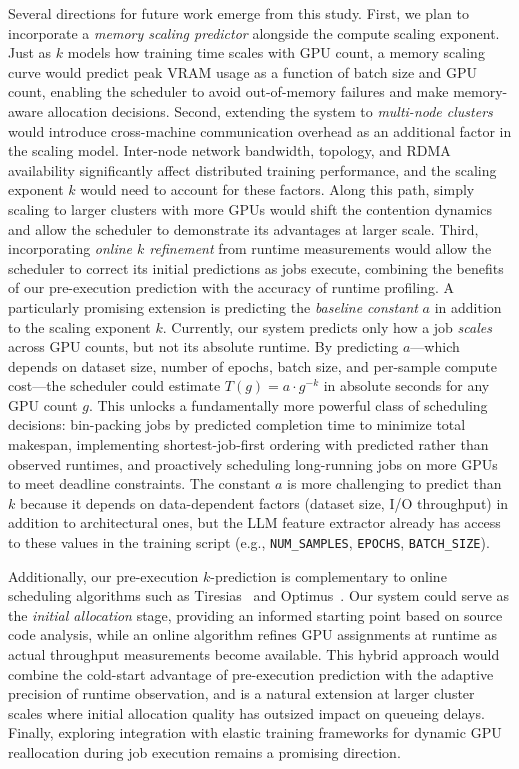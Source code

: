 \documentclass[letterpaper,10pt]{article}
\begin{document}
Several directions for future work emerge from this study. First, we plan to incorporate a \textit{memory scaling predictor} alongside the compute scaling exponent. Just as $k$ models how training time scales with GPU count, a memory scaling curve would predict peak VRAM usage as a function of batch size and GPU count, enabling the scheduler to avoid out-of-memory failures and make memory-aware allocation decisions. Second, extending the system to \textit{multi-node clusters} would introduce cross-machine communication overhead as an additional factor in the scaling model. Inter-node network bandwidth, topology, and RDMA availability significantly affect distributed training performance, and the scaling exponent $k$ would need to account for these factors. Along this path, simply scaling to larger clusters with more GPUs would shift the contention dynamics and allow the scheduler to demonstrate its advantages at larger scale. Third, incorporating \textit{online $k$ refinement} from runtime measurements would allow the scheduler to correct its initial predictions as jobs execute, combining the benefits of our pre-execution prediction with the accuracy of runtime profiling. A particularly promising extension is predicting the \textit{baseline constant} $a$ in addition to the scaling exponent $k$. Currently, our system predicts only how a job \textit{scales} across GPU counts, but not its absolute runtime. By predicting $a$---which depends on dataset size, number of epochs, batch size, and per-sample compute cost---the scheduler could estimate $T(g) = a \cdot g^{-k}$ in absolute seconds for any GPU count $g$. This unlocks a fundamentally more powerful class of scheduling decisions: bin-packing jobs by predicted completion time to minimize total makespan, implementing shortest-job-first ordering with predicted rather than observed runtimes, and proactively scheduling long-running jobs on more GPUs to meet deadline constraints. The constant $a$ is more challenging to predict than $k$ because it depends on data-dependent factors (dataset size, I/O throughput) in addition to architectural ones, but the LLM feature extractor already has access to these values in the training script (e.g., \texttt{NUM\_SAMPLES}, \texttt{EPOCHS}, \texttt{BATCH\_SIZE}).

Additionally, our pre-execution $k$-prediction is complementary to online scheduling algorithms such as Tiresias~\cite{tiresias2019} and Optimus~\cite{optimus2018}. Our system could serve as the \textit{initial allocation} stage, providing an informed starting point based on source code analysis, while an online algorithm refines GPU assignments at runtime as actual throughput measurements become available. This hybrid approach would combine the cold-start advantage of pre-execution prediction with the adaptive precision of runtime observation, and is a natural extension at larger cluster scales where initial allocation quality has outsized impact on queueing delays. Finally, exploring integration with elastic training frameworks for dynamic GPU reallocation during job execution remains a promising direction.



\end{document}
